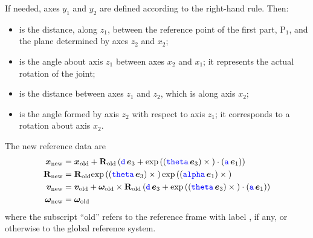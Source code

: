 If needed, axes $y_1$ and $y_2$ are defined according to the right-hand rule.
Then:
\begin{itemize}
\item {} is the distance, along $z_1$, between the reference point of the first part, $\text{P}_1$, and the plane determined by axes $z_2$ and $x_2$;

\item {} is the angle about axis $z_1$ between axes $x_2$ and $x_1$; it represents the actual rotation of the joint;

\item {} is the distance between axes $z_1$ and $z_2$, which is along axis $x_2$;

\item {} is the angle formed by axis $z_2$ with respect to axis $z_1$; it corresponds to a rotation about axis $x_2$.
\end{itemize}

The new reference data are
\begin{subequations}
\begin{align}
	\boldsymbol{x}_\text{new}
	&=
	\boldsymbol{x}_\text{old}
	+
	\bm{\mathbf R}_\text{old} \left( 
		\textcolor{blue}{\texttt{d}} \, \boldsymbol{e}_3
		+
		\text{exp}\left( \left( \textcolor{blue}{\texttt{theta}} \, \boldsymbol{e}_3 \right) \times{} \right) \cdot \left( \textcolor{blue}{\texttt{a}} \, \boldsymbol{e}_1 \right)
	 \right)
	\\
	\bm{\mathbf R}_\text{new}
	&=
	\bm{\mathbf R}_\text{old} \text{exp}\left( \left( \textcolor{blue}{\texttt{theta}} \, \boldsymbol{e}_3 \right) \times{} \right) \text{exp}\left( \left( \textcolor{blue}{\texttt{alpha}} \, \boldsymbol{e}_1 \right) \times{} \right)
	\\
	\boldsymbol{v}_\text{new}
	&=
	\boldsymbol{v}_\text{old}
	+
	\boldsymbol{\omega}_\text{old} \times \bm{\mathbf R}_\text{old} \left( 
		\textcolor{blue}{\texttt{d}} \, \boldsymbol{e}_3
		+
		\text{exp}\left( \left( \textcolor{blue}{\texttt{theta}} \, \boldsymbol{e}_3 \right) \times{} \right) \cdot \left( \textcolor{blue}{\texttt{a}} \, \boldsymbol{e}_1 \right)
	 \right)
	\\
	\boldsymbol{\omega}_\text{new}
	&=
	\boldsymbol{\omega}_\text{old}
\end{align}
\end{subequations}
where the subscript ``old'' refers to the reference frame with label , if any, or otherwise to the global reference system.

